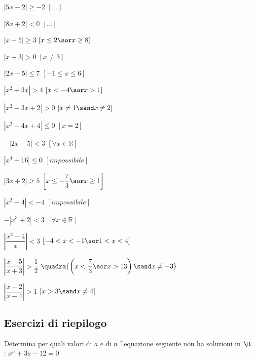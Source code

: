 \begin{esercizio}
\begin{multicols}{2}
\begin{enumeratea}
\item \(\left| 5x-2\right| \geq -2 \)
 \hfill \(\left[ \dots \right] \)
\item \(\left| 8x+2\right| < 0 \)
 \hfill \(\left[ \dots \right] \)
\item \(\left| x-5\right| \geq 3 \)
 \hfill \(\left[ x\leq 2 \sor x\geq 8 \right] \)
\item \(\left| x-3\right| >0 \)
 \hfill \(\left[ x\neq 3 \right] \)
\item \(\left| 2x-5\right| \leq 7 \)
 \hfill \(\left[ -1\leq x \leq 6 \right] \)
\item \(\left| x^2+3x\right| >4 \)
 \hfill \(\left[ x<-4 \sor x>1 \right] \)
\item \(\left| x^2-3x+2\right| >0 \)
 \hfill \(\left[ x\neq 1 \sand x\neq 2 \right] \)
\item \(\left| x^2-4x+4\right| \leq 0 \)
 \hfill \(\left[ x=2 \right] \)
\item \(-\left| 2x-5\right| <3 \)
 \hfill \(\left[ \forall x \in \mathbb{R} \right] \)
\item \(\left| x^4+16\right| \leq 0 \)
 \hfill \(\left[ impossibile \right] \)
\item \(\left| 3x+2\right| \geq 5 \)
 \hfill \(\left[ x\leq -\dfrac{7}{3} \sor x\geq 1 \right] \)
\item \(\left| x^2-4\right| <-4 \)
 \hfill \(\left[ impossibile \right] \)
\item \(-\left| x^3+2\right| <3 \)
 \hfill \(\left[ \forall x \in \mathbb{R} \right] \)
\item \(\left| \dfrac{x^2-4}{x}\right| <3 \)
 \hfill \(\left[ -4<x<-1 \sor 1<x<4 \right] \)
\item \(\left| \dfrac{x-5}{x+3}\right| >\dfrac{1}{2} \)
 \hfill \(\quadra{\left(x<\dfrac{7}{3} \sor x>13 \right) \sand x \neq -3}\)
\item \(\left| \dfrac{x-2}{x-4}\right| >1 \)
 \hfill \(\left[x>3 \sand x \neq 4 \right] \)
\end{enumeratea}
\end{multicols}
\end{esercizio}

\subsection{Esercizi di riepilogo}

\begin{esercizio}\label{ese:03.1}
Determina per quali valori di \(a\) e di \(n\) l’equazione seguente non ha
soluzioni in \(\R\):
\(x^n+3a-12=0\)
\end{esercizio}

